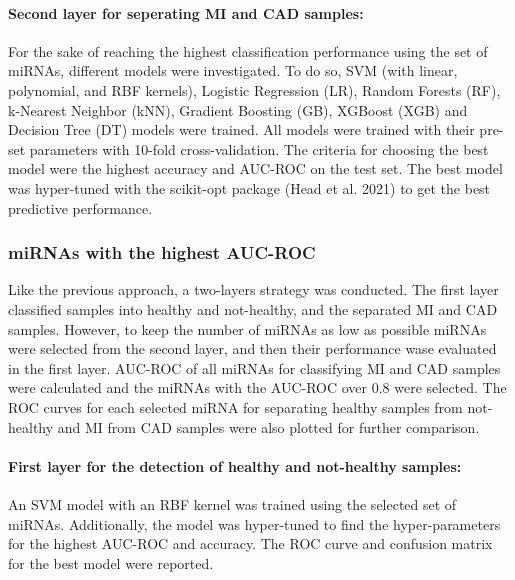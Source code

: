 \documentclass[smallextended]{svjour3}       %
\begin{document}
\hypertarget{second-layer-for-seperating-mi-and-cad-samples}{%
\paragraph{Second layer for seperating MI and CAD
samples:}\label{second-layer-for-seperating-mi-and-cad-samples}}

For the sake of reaching the highest classification performance using
the set of miRNAs, different models were investigated. To do so, SVM
(with linear, polynomial, and RBF kernels), Logistic Regression (LR),
Random Forests (RF), k-Nearest Neighbor (kNN), Gradient Boosting (GB),
XGBoost (XGB) and Decision Tree (DT) models were trained. All models
were trained with their pre-set parameters with 10-fold
cross-validation. The criteria for choosing the best model were the
highest accuracy and AUC-ROC on the test set. The best model was
hyper-tuned with the scikit-opt package (Head et al. 2021) to get the
best predictive performance.

\hypertarget{mirnas-with-the-highest-auc-roc}{%
\subsubsection{miRNAs with the highest
AUC-ROC}\label{mirnas-with-the-highest-auc-roc}}

Like the previous approach, a two-layers strategy was conducted. The
first layer classified samples into healthy and not-healthy, and the
separated MI and CAD samples. However, to keep the number of miRNAs as
low as possible miRNAs were selected from the second layer, and then
their performance wase evaluated in the first layer. AUC-ROC of all
miRNAs for classifying MI and CAD samples were calculated and the miRNAs
with the AUC-ROC over 0.8 were selected. The ROC curves for each
selected miRNA for separating healthy samples from not-healthy and MI
from CAD samples were also plotted for further comparison.

\hypertarget{first-layer-for-the-detection-of-healthy-and-not-healthy-samples}{%
\paragraph{First layer for the detection of healthy and not-healthy
samples:}\label{first-layer-for-the-detection-of-healthy-and-not-healthy-samples}}

An SVM model with an RBF kernel was trained using the selected set of
miRNAs. Additionally, the model was hyper-tuned to find the
hyper-parameters for the highest AUC-ROC and accuracy. The ROC curve and
confusion matrix for the best model were reported.
\end{document}
